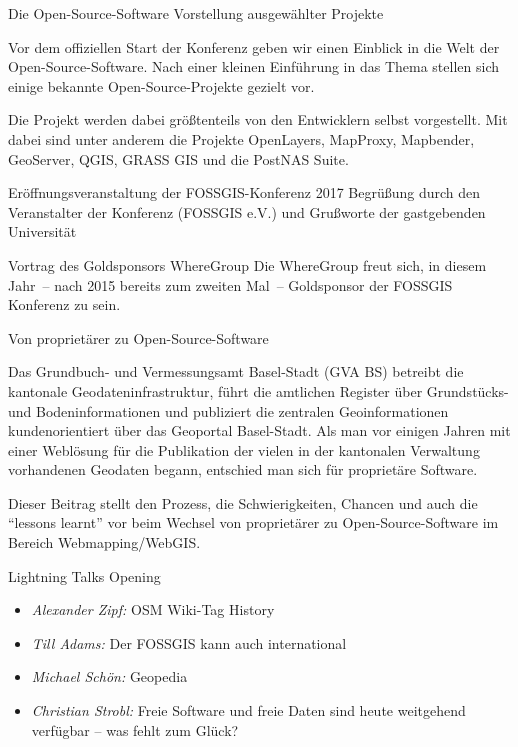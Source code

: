 \newpage
\renewcommand{\konferenztag}{\mittwoch}
%
{Die Open-Source-Software}%
{Vorstellung ausgewählter Projekte}%
{Vor dem offiziellen Start der Konferenz geben wir einen Einblick in die Welt der Open-Source-Software. Nach einer kleinen Einführung in das Thema stellen sich einige bekannte Open-Source-Projekte gezielt vor.

Die Projekt werden dabei größtenteils von den Entwicklern selbst vorgestellt. Mit dabei sind unter anderem
die Projekte OpenLayers, MapProxy, Mapbender, GeoServer, QGIS, GRASS GIS und die PostNAS Suite.}

%
%
{Eröffnungsveranstaltung der FOSSGIS-Konferenz 2017}%
{}%
{Begrüßung durch den Veranstalter der Konferenz (FOSSGIS e.V.) und Grußworte der gastgebenden Universität}
\enlargethispage{1\baselineskip}

%
%
{Vortrag des Goldsponsors WhereGroup}%
{}%
{Die WhereGroup freut sich, in diesem Jahr~-- nach 2015 bereits zum zweiten Mal~--
Goldsponsor der FOSSGIS Konferenz zu sein.}

%
{Von proprietärer zu Open-Source-Software}%
{}{%
Das Grundbuch- und Vermessungsamt Basel-Stadt (GVA BS) betreibt die kantonale
Geodateninfrastruktur, führt die amtlichen Register über Grundstücks- und
Bodeninformationen und publiziert die zentralen Geoinformationen
kundenorientiert über das Geoportal Basel-Stadt. Als man vor einigen Jahren mit
einer Weblösung für die Publikation der vielen in der kantonalen Verwaltung
vorhandenen Geodaten begann, entschied man sich für proprietäre Software.

Dieser Beitrag stellt den Prozess, die Schwierigkeiten, Chancen und auch die
"`lessons learnt"' vor beim Wechsel von proprietärer zu Open-Source-Software im
Bereich Webmapping/WebGIS.}

%
\abstractZehn{}%
{Lightning Talks Opening}%
{}%
{%
  \vspace{-2em}
  \begin{itemize}
    \RaggedRight
    \setlength{\itemsep}{-2pt} %
    \item \emph{Alexander Zipf:} OSM Wiki-Tag History
    \item \emph{Till Adams:} Der FOSSGIS kann auch international
    \item \emph{Michael Schön:} Geopedia
    \item \emph{Christian Strobl:} Freie Software und freie Daten sind heute weitgehend verfügbar -- was fehlt zum Glück?
  \end{itemize}
  \justifying
}


